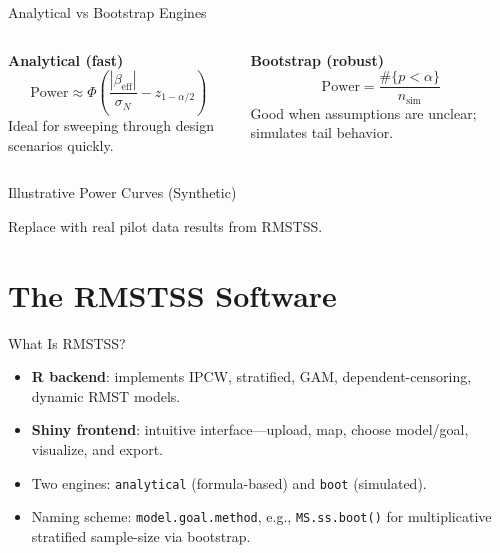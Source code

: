 \documentclass{beamer}
\begin{document}
\begin{frame}{Analytical vs Bootstrap Engines}
\begin{columns}
\begin{column}{0.5\textwidth}
\textbf{Analytical (fast)}\\
\[
\text{Power}\approx \Phi\left(\frac{|\beta_{\text{eff}}|}{\sigma_N}-z_{1-\alpha/2}\right)
\]
Ideal for sweeping through design scenarios quickly.
\end{column}
\begin{column}{0.5\textwidth}
\textbf{Bootstrap (robust)}\\
\[
\text{Power} = \frac{\#\{p < \alpha\}}{n_{\text{sim}}}
\]
Good when assumptions are unclear; simulates tail behavior.
\end{column}
\end{columns}
\end{frame}

\begin{frame}{Illustrative Power Curves (Synthetic)}
\centering
{}

\scriptsize Replace with real pilot data results from RMSTSS.
\end{frame}

\section{The RMSTSS Software}

\begin{frame}{What Is RMSTSS?}
\begin{itemize}
  \item \textbf{R backend}: implements IPCW, stratified, GAM, dependent-censoring, dynamic RMST models.
  \item \textbf{Shiny frontend}: intuitive interface—upload, map, choose model/goal, visualize, and export.
  \item Two engines: \texttt{analytical} (formula-based) and \texttt{boot} (simulated).
  \item Naming scheme: \texttt{model.goal.method}, e.g., \texttt{MS.ss.boot()} for multiplicative stratified sample-size via bootstrap.
\end{itemize}
\end{frame}
\end{document}
